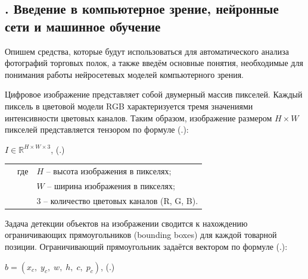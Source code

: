 \subtitlespace

\subsection*{
  \gostTitleFont
  \redline
  \thechaptercntr .\thesubchaptercntr \spc
  Введение в компьютерное зрение, нейронные сети и машинное обучение
} \addtocounter{subchaptercntr}{1}

\subtitlespace

{\gostFont

  \par \redline Опишем средства, которые будут использоваться для автоматического анализа
  фотографий торговых полок, а также введём основные понятия, необходимые для
  понимания работы нейросетевых моделей компьютерного зрения.

  \par \redline Цифровое изображение представляет собой двумерный массив пикселей.
  Каждый пиксель в цветовой модели RGB характеризуется тремя значениями
  интенсивности цветовых каналов.
  Таким образом, изображение размером $H \times W$ пикселей представляется
  тензором по формуле (\thechaptercntr .\theformulacntr):

  \formulaspace
  \par \redline $I \in \mathbb{R}^{H \times W \times 3}$,
  \hfill (\thechaptercntr .\theformulacntr) \hspace*{-0.5cm}\redline
  \formulaspace \addtocounter{formulacntr}{1}

  \begin{tabular}{p{}p{}p{}}
    & где  & $H$ {--} высота изображения в пикселях; \\
    &      & $W$ {--} ширина изображения в пикселях; \\
    &      & $3$ {--} количество цветовых каналов (R, G, B). \\
  \end{tabular}
  \vspace{13pt}
  
  \par \redline Задача детекции объектов на изображении сводится к нахождению
  ограничивающих прямоугольников (bounding boxes) для каждой товарной позиции.
  Ограничивающий прямоугольник задаётся вектором по формуле
  (\thechaptercntr .\theformulacntr):

  \formulaspace
  \par \redline $\hat{b} = \left(x_c,\; y_c,\; w,\; h,\; c,\; p_c\right)$,
  \hfill (\thechaptercntr .\theformulacntr) \hspace*{-0.5cm}\redline
  \formulaspace \addtocounter{formulacntr}{1}

}
